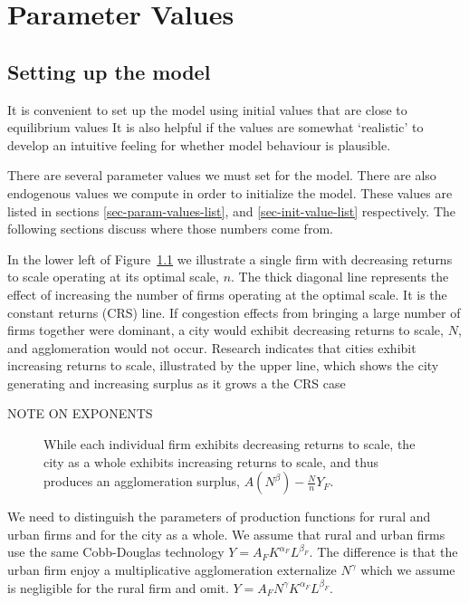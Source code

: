 \chapter[Parameters]{Parameter Values} \label{appendix-paremeters}




\section{Setting up the model}
It is convenient to set up the model using initial values that are close to equilibrium values It is also helpful if the values are somewhat `realistic' to develop an intuitive feeling for whether model behaviour is plausible. 

There are several parameter values we must set for the model. There are also endogenous values we compute in order to initialize the model. These values are listed in sections \ref{sec-param-values-list}, and \ref{sec-init-value-list} respectively. The following sections discuss where those numbers come from. %

In the lower left of Figure~\ref{fig:Agglomeration-surplus}  we illustrate a single firm with decreasing returns to scale operating at its optimal scale, $n$. The thick diagonal line represents the effect of  increasing the number of firms operating at the optimal scale. It is the constant returns (CRS) line. If congestion effects from bringing a large number of firms together were dominant, a city would exhibit decreasing returns to  scale,  $N$, and agglomeration would not occur. Research indicates that cities exhibit increasing returns to scale, illustrated by the upper line, which shows the city generating and increasing surplus as it grows a the CRS case

NOTE ON EXPONENTS

\begin{figure}[htb]
    \centering

    \caption{While each individual firm exhibits decreasing returns to scale, the city as a whole exhibits increasing returns to scale, and thus produces an agglomeration surplus, $A(N^\beta)-\frac{N}{n}Y_F$.}
    \label{fig:Agglomeration-surplus}
\end{figure}

We need to distinguish the parameters of production functions for rural and urban firms and for the city as a whole. We assume that  rural and  urban firms use the same Cobb-Douglas technology $Y=A_FK^{\alpha_F}L^{\beta_F}$. The difference is that the urban firm enjoy a  multiplicative agglomeration externalize $N^\gamma$ which we assume is negligible for the rural firm and omit. $Y=A_FN^\gamma  K^{\alpha_F}L^{\beta_F}$.

